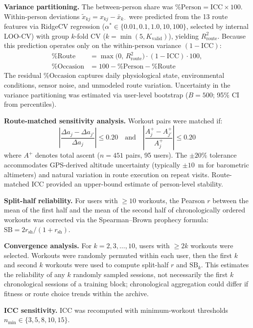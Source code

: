 \documentclass[times, twoside]{zHenriquesLab-StyleBioRxiv}
\begin{document}
\textbf{Variance partitioning.} The between-person share was $\%\text{Person} = \text{ICC} \times 100$. Within-person deviations $\tilde{x}_{kj} = x_{kj} - \bar{x}_{k\cdot}$ were predicted from the 13 route features via RidgeCV regression ($\alpha^* \in \{0.01, 0.1, 1.0, 10, 100\}$, selected by internal LOO-CV) with group $k$-fold CV ($k = \min(5, K_{\text{valid}})$), yielding $R^2_{\text{route}}$. Because this prediction operates only on the within-person variance $(1 - \text{ICC})$:
\begin{align*}
  \%\text{Route} &= \max\!\bigl(0,\, R^2_{\text{route}}\bigr)
    \cdot (1 - \text{ICC}) \cdot 100, \\
  \%\text{Occasion} &= 100 - \%\text{Person} - \%\text{Route}
\end{align*}
The residual $\%\text{Occasion}$ captures daily physiological state, environmental conditions, sensor noise, and unmodeled route variation. Uncertainty in the variance partitioning was estimated via user-level bootstrap ($B = 500$; 95\% CI from percentiles).

\textbf{Route-matched sensitivity analysis.} Workout pairs were matched if:
\[
  \left|\frac{\Delta a_j - \Delta a_{j'}}{\Delta a_j}\right| \leq 0.20 \quad \text{and} \quad \left|\frac{A_j^+ - A_{j'}^+}{A_j^+}\right| \leq 0.20
\]
where $A^+$ denotes total ascent ($n = 451$ pairs, 95 users). The $\pm 20\%$ tolerance accommodates GPS-derived altitude uncertainty (typically $\pm 10$~m for barometric altimeters) and natural variation in route execution on repeat visits. Route-matched ICC provided an upper-bound estimate of person-level stability.

\textbf{Split-half reliability.} For users with $\geq 10$ workouts, the Pearson $r$ between the mean of the first half and the mean of the second half of chronologically ordered workouts was corrected via the Spearman--Brown prophecy formula: $\text{SB} = 2r_{\text{sh}} / (1 + r_{\text{sh}})$.

\textbf{Convergence analysis.} For $k = 2, 3, \ldots, 10$, users with $\geq 2k$ workouts were selected. Workouts were randomly permuted within each user, then the first $k$ and second $k$ workouts were used to compute split-half $r$ and $\text{SB}_k$. This estimates the reliability of any $k$ randomly sampled sessions, not necessarily the first $k$ chronological sessions of a training block; chronological aggregation could differ if fitness or route choice trends within the archive.

\textbf{ICC sensitivity.} ICC was recomputed with minimum-workout thresholds $n_{\min} \in \{3, 5, 8, 10, 15\}$.
\end{document}
